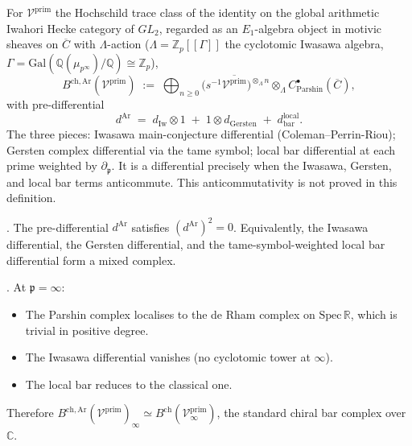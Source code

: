 \begin{definition}
\label{v4-arith:def:lambda-tensor-coalgebra}
For \(\mathcal{V}^{\mathrm{prim}}\) the Hochschild trace class of
the identity on the global arithmetic Iwahori Hecke category of
\(GL_2\), regarded as an \(E_1\)-algebra object in motivic sheaves
on \(\overline{C}\) with \(\Lambda\)-action
(\(\Lambda=\mathbb{Z}_{p}[[\Gamma]]\) the cyclotomic Iwasawa
algebra, \(\Gamma=\mathrm{Gal}(\mathbb{Q}(\mu_{p^{\infty}})/\mathbb{Q})\cong\mathbb{Z}_{p}\)),
\begin{equation}
B^{\mathrm{ch,Ar}}(\mathcal{V}^{\mathrm{prim}})\;:=\;\bigoplus_{n\geq 0}\bigl(s^{-1}\overline{\mathcal{V}^{\mathrm{prim}}}\bigr)^{\otimes_{\Lambda}n}\otimes_{\Lambda}C^{\bullet}_{\mathrm{Parshin}}(\overline{C}),
\end{equation}
with pre-differential
\begin{equation}
d^{\mathrm{Ar}}\;=\;d_{\mathrm{Iw}}\otimes 1\;+\;1\otimes d_{\mathrm{Gersten}}\;+\;d_{\mathrm{bar}}^{\mathrm{local}}.
\end{equation}
The three pieces: Iwasawa main-conjecture differential
(Coleman--Perrin-Riou); Gersten complex differential via the tame
symbol; local bar differential at each prime weighted by
\(\partial_{\mathfrak{p}}\).
It is a differential precisely when the Iwasawa, Gersten, and local bar
terms anticommute. This anticommutativity is not proved in this
definition.
\end{definition}

\begin{conjecture}
\label{v4-arith:bar:conj:dAr-square-zero}
\ClaimStatusConjectured. The pre-differential \(d^{\mathrm{Ar}}\) satisfies
\((d^{\mathrm{Ar}})^{2}=0\). Equivalently, the Iwasawa differential, the
Gersten differential, and the tame-symbol-weighted local bar
differential form a mixed complex.
\end{conjecture}

\begin{theorem}
\label{v4-arith:thm:archimedean-reduction}
\ClaimStatusProvedHere. At \(\mathfrak{p}=\infty\):
\begin{itemize}
\item The Parshin complex localises to the de Rham complex on
\(\mathrm{Spec}\,\mathbb{R}\), which is trivial in positive degree.
\item The Iwasawa differential vanishes (no cyclotomic tower at
\(\infty\)).
\item The local bar reduces to the classical one.
\end{itemize}
Therefore
\(B^{\mathrm{ch,Ar}}(\mathcal{V}^{\mathrm{prim}})_{\infty}\simeq B^{\mathrm{ch}}(\mathcal{V}^{\mathrm{prim}}_{\infty})\),
the standard chiral bar complex over \(\mathbb{C}\).
\end{theorem}

